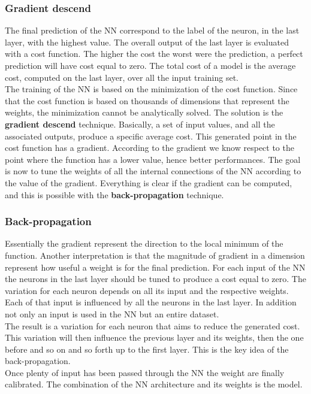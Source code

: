 \subsubsection*{Gradient descend}
The final prediction of the NN correspond to the label of the neuron, in the last layer, with the highest value. The overall output of the last layer is evaluated with a cost function. The higher the cost the worst were the prediction, a perfect prediction will have cost equal to zero. The total cost of a model is the average cost, computed on the last layer, over all the input training set.\\
The training of the NN is based on the minimization of the cost function. Since that the cost function is based on thousands of dimensions that represent the weights, the minimization cannot be analytically solved. The solution is the \textbf{gradient descend} technique. Basically, a set of input values, and all the associated outputs, produce a specific average cost. This generated point in the cost function has a gradient. According to the gradient we know respect to the point where the function has a lower value, hence better performances. The goal is now to tune the weights of all the internal connections of the NN according to the value of the gradient. Everything is clear if the gradient can be computed, and this is possible with the \textbf{back-propagation} technique.

\subsubsection*{Back-propagation}
Essentially the gradient represent the direction to the local minimum of the function. Another interpretation is that the magnitude of gradient in a dimension represent how useful a weight is for the final prediction. For each input of the NN the neurons in the last layer should be tuned to produce a cost equal to zero. The variation for each neuron depends on all its input and the respective weights. Each of that input is influenced by all the neurons in the last layer. In addition not only an input is used in the NN but an entire dataset.\\
The result is a variation for each neuron that aims to reduce the generated cost. This variation will then influence the previous layer and its weights, then the one before and so on and so forth up to the first layer. This is the key idea of the back-propagation.\\
Once plenty of input has been passed through the NN the weight are finally calibrated. The combination of the NN architecture and its weights is the model.


